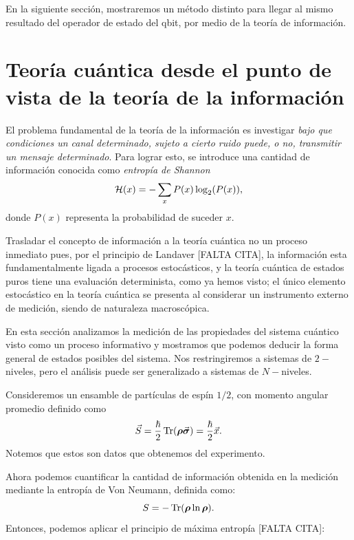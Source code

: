 \documentclass[../Main.tex]{subfiles}
\begin{document}
En la siguiente sección, mostraremos un método distinto para llegar al mismo resultado del operador de estado del qbit, por medio de la teoría de información.



\section{Teoría cuántica desde el punto de vista de la teoría de la información}
El problema fundamental de la teoría de la información es investigar \emph{bajo que condiciones un canal determinado, sujeto a cierto ruido puede, o no, transmitir un mensaje determinado}. Para lograr esto, se introduce una cantidad de información conocida como \emph{entropía de Shannon}
\begin{equation}
    \mathcal{H}(x)=-\sum_xP(x)\log_2(P(x)),
\end{equation}
donde $P(x)$ representa la probabilidad de suceder $x$.

Trasladar el concepto de información a la teoría cuántica no un proceso inmediato pues, por el principio de Landaver [FALTA CITA], la información esta fundamentalmente ligada a procesos estocásticos, y la teoría cuántica de estados puros tiene una evaluación determinista, como ya hemos visto; el único elemento estocástico en la teoría cuántica se presenta al considerar un instrumento externo de medición, siendo de naturaleza macroscópica.

En esta sección analizamos la medición de las propiedades del sistema cuántico visto como un proceso informativo y mostramos que podemos deducir la forma general de estados posibles del sistema. Nos restringiremos a sistemas de $2-$niveles, pero el análisis puede ser generalizado a sistemas de $N-$niveles.

Consideremos un ensamble de partículas de espín $1/2$, con momento angular promedio definido como
\begin{equation}
\vec{S}=\frac{\hbar}{2}\Tr(\bm{\rho}\vec{\bm{\sigma}})=\frac{\hbar}{2}\vec{x}.
\label{def:espin_promedio_info}
\end{equation}
Notemos que estos son datos que obtenemos del experimento.

Ahora podemos cuantificar la cantidad de información obtenida en la medición mediante la entropía de Von Neumann, definida como:
\begin{equation}
    S=-\Tr(\bm{\rho}\ln\bm{\rho}).
\end{equation}
Entonces, podemos aplicar el  principio de máxima entropía [FALTA CITA]:
\end{document}
